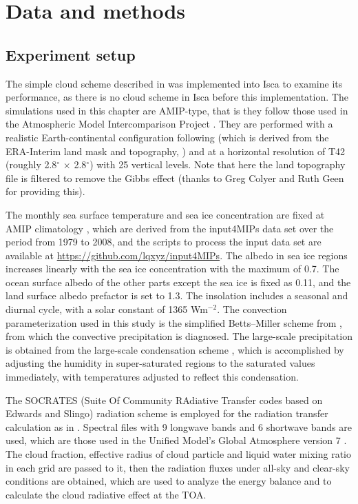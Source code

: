 \section{Data and methods}
\label{sec:exp_setup_and_dataset}

\subsection{Experiment setup}
\label{sec:eval_cld_exp_setup}
The simple cloud scheme described in  was implemented into Isca \citep{Vallis2018} to examine its performance, as there is no cloud scheme in Isca before this implementation. The simulations used in this chapter are AMIP-type, that is they follow those used in the Atmospheric Model Intercomparison Project . They are performed with a realistic Earth-continental configuration following \citet{Thomson2018} (which is derived from the ERA-Interim land mask and topography, \citealt{Dee2011}) and at a horizontal resolution of T42 (roughly 2.8$^\circ$ $\times$ 2.8$^\circ$) with 25 vertical levels. Note that here the land topography file is filtered to remove the Gibbs effect (thanks to Greg Colyer and Ruth Geen for providing this).

The monthly sea surface temperature and sea ice concentration are fixed at AMIP climatology \citep{Taylor2000sea}, which are derived from the input4MIPs data set \citep{Durack2018} over the period from 1979 to 2008, and the scripts to process the input data set are available at \url{https://github.com/lqxyz/input4MIPs}. The albedo in sea ice regions increases linearly with the sea ice concentration with the maximum of 0.7. The ocean surface albedo of the other parts except the sea ice is fixed as 0.11, and the land surface albedo prefactor is set to 1.3. The insolation includes a seasonal and diurnal cycle, with a solar constant  of 1365 Wm$^{-2}$. The convection parameterization used in this study is the simplified Betts--Miller scheme from \citet{Frierson2007}, from which the convective precipitation is diagnosed. The large-scale precipitation is obtained from the large-scale condensation scheme \citep{Frierson2007}, which is accomplished by adjusting the humidity in super-saturated regions to the saturated values immediately, with temperatures adjusted to reflect this condensation. 

The SOCRATES (Suite Of Community RAdiative Transfer codes based on Edwards and Slingo) radiation scheme  \citep{Edwards1996, Manners2015} is employed for the radiation transfer calculation as in \citet{Thomson2019}. Spectral files with 9 longwave bands and 6 shortwave bands are used, which are those used in the Unified Model's Global Atmosphere version 7 \citep{Walters2019}. The cloud fraction, effective radius of cloud particle and liquid water mixing ratio in each grid are passed to it, then the radiation fluxes under all-sky and clear-sky conditions are obtained, which are used to analyze the energy balance and to calculate the cloud radiative effect \citep{Ramanathan1989, Li2017} at the TOA.

